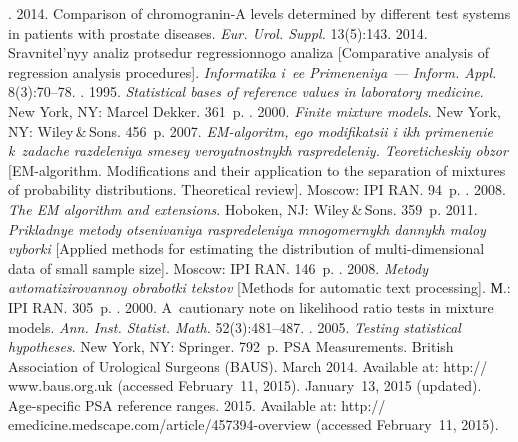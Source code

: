 \begin{multicols}{2}
{{\begin{thebibliography}{99}
.
2014. Comparison of chromogranin-A levels determined by different test systems in
patients with prostate diseases. \textit{Eur. Urol. Suppl.} 13(5):143.
 2014. Sravnitel'nyy analiz protsedur regressionnogo analiza
[Comparative analysis of regression analysis procedures]. \textit{Informatika i~ee
Primeneniya}~--- \textit{Inform. Appl.}  8(3):70--78.
. 1995. \textit{Statistical bases of reference
values in laboratory medicine}. New York, NY: Marcel Dekker. 361~p.
. 2000. \textit{Finite mixture models}.
New York, NY:
Wiley\,\&\,Sons.  456~p.
 2007. \textit{EM-algoritm, ego modifikatsii i ikh primenenie
k~zadache razdeleniya smesey veroyatnostnykh raspredeleniy. Teoreticheskiy obzor}
[EM-algorithm. Modifications and their application to the separation of mixtures of
probability distributions. Theoretical review]. Moscow: IPI RAN. 94~p.
. 2008. \textit{The EM algorithm and
extensions}. Hoboken, NJ: Wiley\,\&\,Sons. 359~p.
 2011. \textit{Prikladnye metody otsenivaniya raspredeleniya
mnogomernykh dannykh maloy vyborki} [Applied methods for estimating the
distribution of multi-dimensional data of small sample size]. Moscow: IPI RAN.
146~p.
.  2008. \textit{Metody avtomatizirovannoy
obrabotki tekstov} [Methods for automatic text processing]. М.: IPI RAN. 305~p.
. 2000. A~cautionary note on likelihood
ratio tests in mixture models. \textit{Ann. Inst. Statist. Math.} 52(3):481--487.
. 2005. \textit{Testing statistical
hypotheses}. New York, NY: Springer. 792~p.
PSA Measurements. British Association of Urological Surgeons (BAUS). March
2014. Available at: {\sf http:// www.baus.org.uk} (accessed February~11, 2015).
 January~13, 2015  (updated).
Age-specific PSA reference ranges.
2015. Available at: {\sf http:// emedicine.medscape.com/article/457394-overview}
(accessed February~11, 2015).
\end{thebibliography}

 }
 }

\end{multicols}

